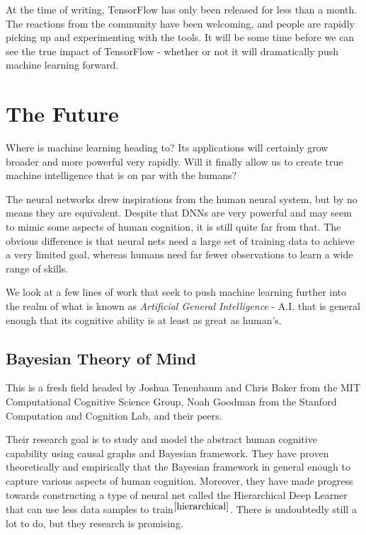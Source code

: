 \documentclass[12pt]{article}  %
\begin{document}
At the time of writing, TensorFlow has only been released for less than a month. The reactions from the community have been welcoming, and people are rapidly picking up and experimenting with the tools. It will be some time before we can see the true impact of TensorFlow - whether or not it will dramatically push machine learning forward.







\section{The Future}

Where is machine learning heading to? Its applications will certainly grow broader and more powerful very rapidly. Will it finally allow us to create true machine intelligence that is on par with the humans?

The neural networks drew inspirations from the human neural system, but by no means they are equivalent. Despite that DNNs are very powerful and may seem to mimic some aspects of human cognition, it is still quite far from that. The obvious difference is that neural nets need a large set of training data to achieve a very limited goal, whereas humans need far fewer observations to learn a wide range of skills.

We look at a few lines of work that seek to push machine learning further into the realm of what is known as \emph{Artificial General Intelligence} - A.I. that is general enough that its cognitive ability is at least as great as human's.


\subsection{Bayesian Theory of Mind}

This is a fresh field headed by Joshua Tenenbaum and Chris Baker from the MIT Computational Cognitive Science Group, Noah Goodman from the Stanford Computation and Cognition Lab, and their peers.

Their research goal is to study and model the abstract human cognitive capability using causal graphs and Bayesian framework. They have proven theoretically and empirically that the Bayesian framework in general enough to capture various aspects of human cognition. Moreover, they have made progress towards constructing a type of neural net called the Hierarchical Deep Learner that can use less data samples to train$^{\ref{hierarchical}}$. There is undoubtedly still a lot to do, but they research is promising.
\end{document}
